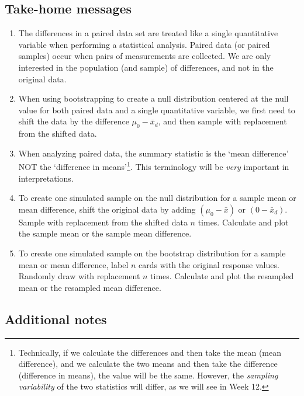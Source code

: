 \documentclass[
]{report}
\begin{document}
\vspace{.7in}

\hypertarget{take-home-messages-17}{%
\subsection{Take-home messages}\label{take-home-messages-17}}

\begin{enumerate}
\def\labelenumi{\arabic{enumi}.}
\item
  The differences in a paired data set are treated like a single quantitative variable when performing a statistical analysis. Paired data (or paired samples) occur when pairs of measurements are collected. We are only interested in the population (and sample) of differences, and not in the original data.
\item
  When using bootstrapping to create a null distribution centered at the null value for both paired data and a single quantitative variable, we first need to shift the data by the difference \(\mu_0 - \bar{x}_d\), and then sample with replacement from the shifted data.
\item
  When analyzing paired data, the summary statistic is the `mean difference' NOT the `difference in means'\footnote{Technically, if we calculate the differences and then take the mean (mean difference), and we calculate the two means and then take the difference (difference in means), the value will be the same. However, the \emph{sampling variability} of the two statistics will differ, as we will see in Week 12.}. This terminology will be \emph{very} important in interpretations.
\item
  To create one simulated sample on the null distribution for a sample mean or mean difference, shift the original data by adding \((\mu_0 - \bar{x})\) or \((0 - \bar{x}_d)\). Sample with replacement from the shifted data \(n\) times. Calculate and plot the sample mean or the sample mean difference.
\item
  To create one simulated sample on the bootstrap distribution for a sample mean or mean difference, label \(n\) cards with the original response values. Randomly draw with replacement \(n\) times. Calculate and plot the resampled mean or the resampled mean difference.
\end{enumerate}

\hypertarget{additional-notes-16}{%
\subsection{Additional notes}\label{additional-notes-16}}
\end{document}
